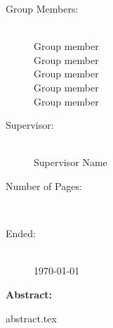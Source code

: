 \begin{titlepage}
\begin{nopagebreak}
\begin{minipage}[t]{0.4\textwidth}
\begin{description}
                    \GROUP
                \item[Group Members:] \hfill\\
                    Group member \\
                    Group member \\
                    Group member \\
                    Group member \\
                    Group member \\
                \item[Supervisor:] \hfill\\
                    Supervisor Name
                \item[Number of Pages:] \hfill\\
                    \pageref{LastPage}
                \item[Ended:] \hfill\\
                    \today
            \end{description}
        \end{minipage} \hfill
        \begin{minipage}[t]{0.5\textwidth}
            \textbf{Abstract:}\\
            \begin{problemstatement}
                {abstract.tex}
            \end{problemstatement}
        \end{minipage}
    \end{nopagebreak}
\end{titlepage}
